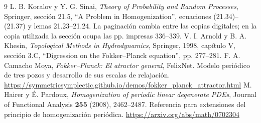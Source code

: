 \documentclass[11pt,a4paper]{article}
\theoremstyle{remark}\newtheorem{remark}{Observación}
\begin{document}
\begin{thebibliography}{9}
 L. B. Koralov y Y. G. Sinai, \emph{Theory of Probability and Random Processes}, Springer, sección 21.5, ``A Problem in Homogenization'', ecuaciones (21.34)--(21.37) y lemas 21.23--21.24. La paginación cambia entre las copias digitales; en la copia utilizada la sección ocupa las pp. impresas 336--339.
 V. I. Arnold y B. A. Khesin, \emph{Topological Methods in Hydrodynamics}, Springer, 1998, capítulo V, sección 3.C, ``Digression on the Fokker--Planck equation'', pp. 277--281.
 F. A. Camacho Moya, \emph{Fokker--Planck: El atractor general}, FelixNet. Modelo periódico de tres pozos y desarrollo de sus escalas de relajación.\newline
\url{https://symmetricsymplectic.github.io/demos/fokker_planck_attractor.html}
 M. Hairer y É. Pardoux, \emph{Homogenization of periodic linear degenerate PDEs}, Journal of Functional Analysis \textbf{255} (2008), 2462--2487. Referencia para extensiones del principio de homogenización periódica.\newline
\url{https://arxiv.org/abs/math/0702304}
\end{thebibliography}
\end{document}
